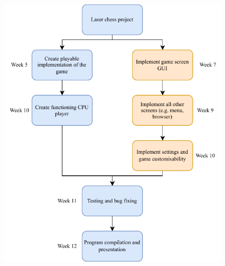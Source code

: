 \documentclass[../main/main.tex]{subfiles}
\begin{document}
\begin{figure}[H]
    \centering
    \includegraphics[width=\columnwidth]{../analysis/assets/critical_path_diagram.pdf}
    \label{fig:critical-path-diagram}
\end{figure}
\end{document}
